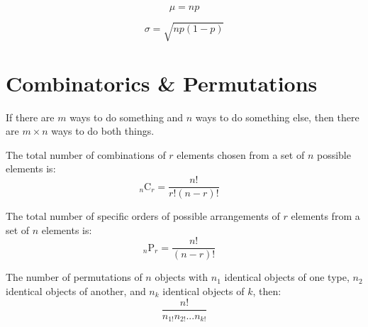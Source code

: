 \documentclass[11pt]{article}
\newcommand{\comb}[2]{{}_{#1}\mathrm{C}_{#2}}
\newcommand{\perm}[2]{{}_{#1}\mathrm{P}_{#2}}
\begin{document}
\begin{definition}\label{def:mean-binom-prob}
    \begin{equation*}
        \mu = n p
    \end{equation*}
\end{definition}

\begin{definition}\label{def:stddev-binom-prob}
    \begin{equation*}
        \sigma = \sqrt{np (1-p)}
    \end{equation*}
\end{definition}

\section{Combinatorics \& Permutations}

\begin{definition}\label{def:fund-count-principle}
    If there are $m$ ways to do something and $n$ ways to do something else, then there are
    $m \times n$ ways to do both things.
\end{definition}

\begin{definition}\label{def:combinations-formula}
    The total number of combinations of $r$ elements chosen from a set of $n$ possible elements is:
    \begin{equation*}
        \comb{n}{r} = \frac{n!}{r!(n-r)!}\quad
    \end{equation*}
\end{definition}

\begin{definition}\label{def:permutations-formula}
    The total number of specific orders of possible arrangements of $r$
    elements from a set of $n$ elements is:
    \begin{equation*}
        \perm{n}{r} = \frac{n!}{(n-r)!}\quad
    \end{equation*}

    The number of permutations of $n$ objects with $n_1$ identical objects
    of one type, $n_2$ identical objects of another, and $n_k$ identical objects
    of $k$, then:
    \begin{equation*}
        \frac{n!}{n_{1!}n_{2!} ... n_{k!}}
    \end{equation*}
\end{definition}
\end{document}
